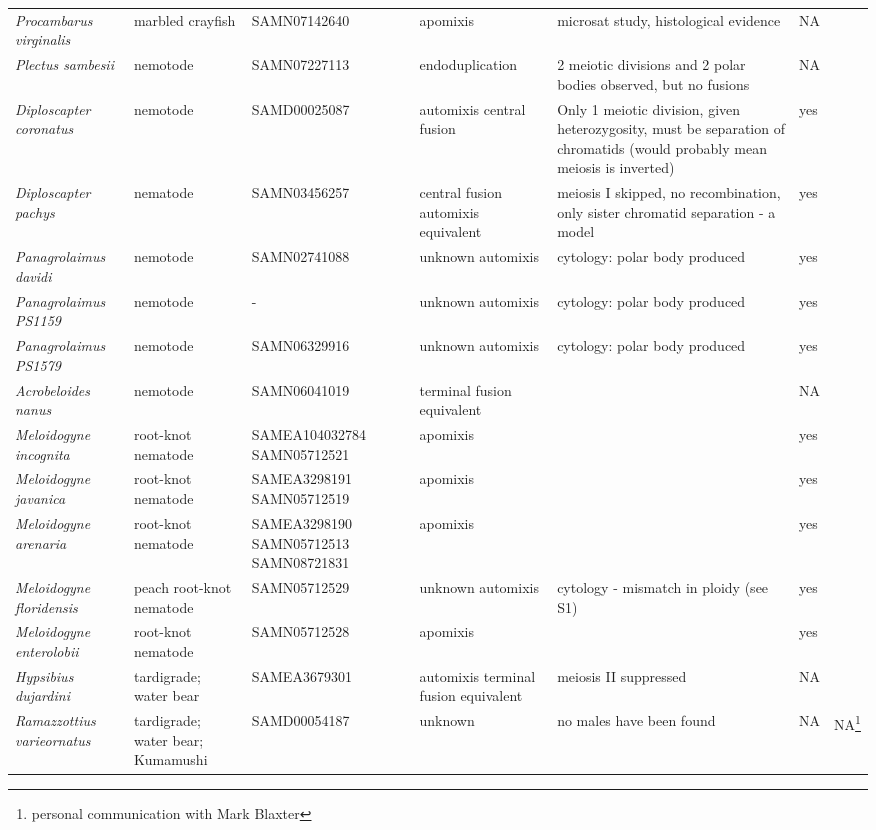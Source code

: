 \documentclass{article}
\begin{document}
\begin{longtable}[H]{ C{.13\textwidth} C{.1\textwidth} C{.12\textwidth} L{.2\textwidth} L{.15\textwidth} C{.1\textwidth} C{.07\textwidth}}
      \textit{Procambarus virginalis} & marbled crayfish & SAMN07142640 & apomixis & microsat study, histological evidence & NA & \cite{Vogt2004,Martin2015} \\
      \textit{Plectus sambesii} & nemotode & SAMN07227113 & endoduplication & 2 meiotic divisions and 2 polar bodies observed, but no fusions & NA & \cite{Lahl2006} \\
      \textit{Diploscapter coronatus} & nemotode & SAMD00025087 & automixis central fusion & Only 1 meiotic division, given heterozygosity, must be separation of chromatids (would probably mean meiosis is inverted) & yes & \cite{Lahl2006,Hiraki2017} \\
      \textit{Diploscapter pachys} & nematode & SAMN03456257 & central fusion automixis equivalent & meiosis I skipped, no recombination, only sister chromatid separation - a model & yes & \cite{Fradin2017} \\
      \textit{Panagrolaimus davidi} & nemotode & SAMN02741088 & unknown automixis & cytology: polar body produced & yes & \cite{Schiffer2017} \\
      \textit{Panagrolaimus PS1159} & nemotode & - & unknown automixis & cytology: polar body produced & yes & \cite{Schiffer2017} \\
      \textit{Panagrolaimus PS1579} & nemotode & SAMN06329916 & unknown automixis & cytology: polar body produced & yes & \cite{Schiffer2017} \\
      \textit{Acrobeloides nanus} & nemotode & SAMN06041019 & terminal fusion equivalent & & NA & \cite{Lahl2006} \\
      \textit{Meloidogyne incognita} & root-knot nematode & SAMEA104032784 SAMN05712521 & apomixis & & yes & \cite{Triantaphyllou1981, VanderBeek1998} \\
      \textit{Meloidogyne javanica} & root-knot nematode & SAMEA3298191 SAMN05712519 & apomixis & & yes & \\
      \textit{Meloidogyne arenaria} & root-knot nematode & SAMEA3298190 SAMN05712513 SAMN08721831 & apomixis & & yes & \\
      \textit{Meloidogyne floridensis} & peach root-knot nematode & SAMN05712529 & unknown automixis & cytology - mismatch in ploidy (see S1) & yes & \cite{Handoo2004} \\
      \textit{Meloidogyne enterolobii} & root-knot nematode & SAMN05712528 & apomixis & & yes \\
      \textit{Hypsibius dujardini} & tardigrade; water bear & SAMEA3679301 & automixis terminal fusion equivalent & meiosis II suppressed & NA & \cite{Ammermann1967} \\
      \textit{Ramazzottius varieornatus} & tardigrade; water bear; Kumamushi & SAMD00054187 & unknown & no males have been found & NA & NA\footnote{personal communication with Mark Blaxter} \\

    \end{longtable}

  \clearpage
  \newpage

  {}
  
\end{document}
